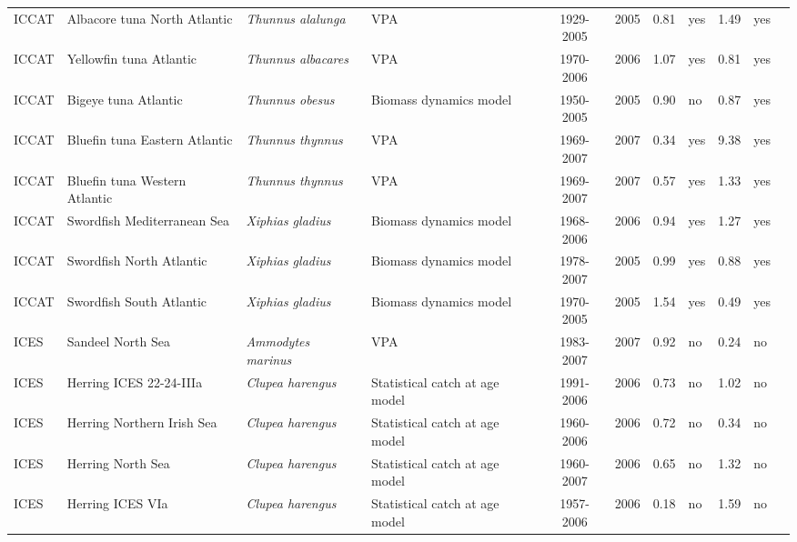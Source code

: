 \begin{longtable}{p{1.8cm}p{3.5cm}p{3.5cm}p{3cm}cccp{0.9cm}cp{0.9cm}c}
  ICCAT & Albacore tuna North Atlantic & \textit{Thunnus alalunga} & VPA & 1929-2005 & 2005 & 0.81 & yes & 1.49 & yes & \cite{ref2007-ALB-STOCK-ASSESS-REP.pdf} \\ 
  ICCAT & Yellowfin tuna Atlantic & \textit{Thunnus albacares} & VPA & 1970-2006 & 2006 & 1.07 & yes & 0.81 & yes & \cite{JENSEN-YFINATL-2008.pdf} \\ 
  ICCAT & Bigeye tuna Atlantic & \textit{Thunnus obesus} & Biomass dynamics model & 1950-2005 & 2005 & 0.90 & no & 0.87 & yes & \cite{JENSEN-BIGEYEATL-2008.pdf} \\ 
  ICCAT & Bluefin tuna Eastern Atlantic & \textit{Thunnus thynnus} & VPA & 1969-2007 & 2007 & 0.34 & yes & 9.38 & yes & \cite{ref2008-BFT-STOCK-ASSESS-REP.pdf} \\ 
  ICCAT & Bluefin tuna Western Atlantic & \textit{Thunnus thynnus} & VPA & 1969-2007 & 2007 & 0.57 & yes & 1.33 & yes & \cite{ref2008-BFT-STOCK-ASSESS-REP.pdf} \\ 
  ICCAT & Swordfish Mediterranean Sea & \textit{Xiphias gladius} & Biomass dynamics model & 1968-2006 & 2006 & 0.94 & yes & 1.27 & yes & \cite{ICCAT-Mediterranean-Xiphiasgladius-2007.pdf} \\ 
  ICCAT & Swordfish North Atlantic & \textit{Xiphias gladius} & Biomass dynamics model & 1978-2007 & 2005 & 0.99 & yes & 0.88 & yes & \cite{JENSEN-SWORDSATL-2007.pdf} \\ 
  ICCAT & Swordfish South Atlantic & \textit{Xiphias gladius} & Biomass dynamics model & 1970-2005 & 2005 & 1.54 & yes & 0.49 & yes & \cite{JENSEN-SWORDSATL-2007.pdf} \\ 
  ICES & Sandeel North Sea & \textit{Ammodytes marinus} & VPA & 1983-2007 & 2007 & 0.92 & no & 0.24 & no & \cite{ICES-WGNSSK-2007.pdf} \\ 
  ICES & Herring ICES 22-24-IIIa & \textit{Clupea harengus} & Statistical catch at age model & 1991-2006 & 2006 & 0.73 & no & 1.02 & no & \cite{ICES-HAWG-2007.pdf} \\ 
  ICES & Herring Northern Irish Sea & \textit{Clupea harengus} & Statistical catch at age model & 1960-2006 & 2006 & 0.72 & no & 0.34 & no & \cite{ICES-HAWG-2007.pdf} \\ 
  ICES & Herring North Sea & \textit{Clupea harengus} & Statistical catch at age model & 1960-2007 & 2006 & 0.65 & no & 1.32 & no & \cite{ICES-HAWG-2007.pdf} \\ 
  ICES & Herring ICES VIa & \textit{Clupea harengus} & Statistical catch at age model & 1957-2006 & 2006 & 0.18 & no & 1.59 & no & \cite{ICES-HAWG-2007.pdf} \\ 

\end{longtable}
